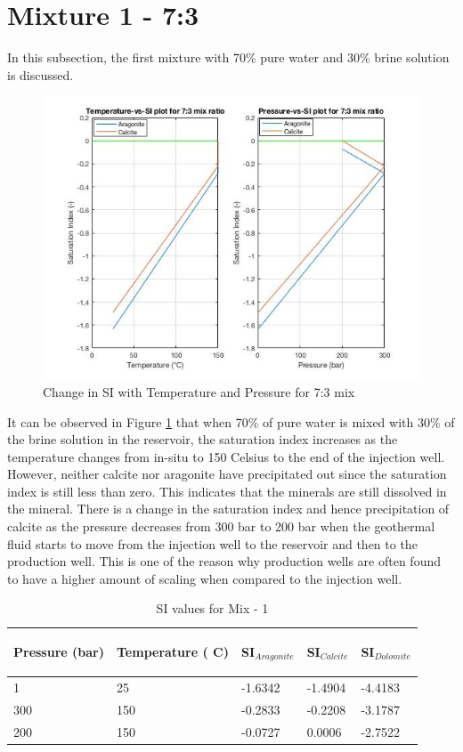 \section{Mixture 1 - 7:3}
In this subsection, the first mixture with 70\% pure water and 30\% brine solution is discussed. 
\begin{figure}[h!]
    \centering
    \includegraphics[scale=0.7]{7-3-ratio.jpg}
    \caption{Change in SI with Temperature and Pressure for 7:3 mix }
    \label{fig:7-3}
\end{figure}
 It can be observed in Figure \ref{fig:7-3} that when 70\% of pure water is mixed with 30\% of the brine solution in the reservoir, the saturation index increases as the temperature changes from in-situ to 150 Celsius to the end of the injection well. However, neither calcite nor aragonite have precipitated out since the saturation index is still less than zero. This indicates that the minerals are still dissolved in the mineral. There is a change in the saturation index and hence precipitation of calcite as the pressure decreases from 300 bar to 200 bar when the geothermal fluid starts to move from the injection well to the reservoir and then to the production well. This is one of the reason why production wells are often found to have a higher amount of scaling when compared to the injection well. 
 
 \begin{table}[h!]
\begin{tabular}{|l|l|l|l|l|}
\centering
\label{7-3table}
\caption{SI values for Mix - 1}
\hline
Pressure (bar) & Temperature ( C) & SI$_{Aragonite}$ & SI$_{Calcite}$ & SI$_{Dolomite}$ \\ \hline
1              & 25               & -1.6342       & -1.4904     & -4.4183      \\ \hline
300            & 150              & -0.2833       & -0.2208     & -3.1787      \\ \hline
200            & 150              & -0.0727       & 0.0006      & -2.7522      \\ \hline
\end{tabular}
\end{table}
